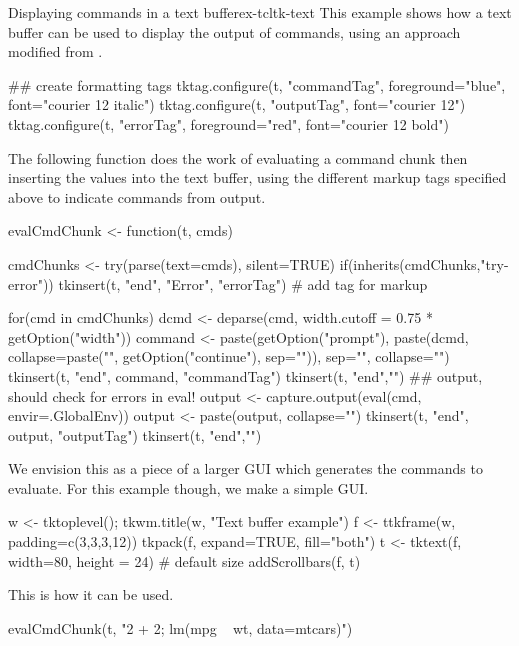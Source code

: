 \begin{example}{Displaying commands in a text buffer}{ex-tcltk-text}
This example shows how a text buffer can be used to display the output
of \R\/ commands, using an approach modified from .

\begin{Schunk}
\begin{Sinput}
 ## create formatting tags
 tktag.configure(t, "commandTag", foreground="blue", 
                 font="courier 12 italic")
 tktag.configure(t, "outputTag", font="courier 12")
 tktag.configure(t, "errorTag", foreground="red", 
                 font="courier 12 bold")
\end{Sinput}
\end{Schunk}

The following function does the work of evaluating a command chunk
then inserting the values into the text buffer, using the different
markup tags specified above to indicate commands from output.

\begin{Schunk}
\begin{Sinput}
 evalCmdChunk <- function(t, cmds) {
   
   cmdChunks <- try(parse(text=cmds), silent=TRUE)
   if(inherits(cmdChunks,"try-error")) {
     tkinsert(t, "end", "Error", "errorTag") # add tag for markup
   }
 
   for(cmd in cmdChunks) {
     dcmd <- deparse(cmd, width.cutoff = 0.75 * getOption("width"))
     command <- 
       paste(getOption("prompt"),
             paste(dcmd, collapse=paste("\n", getOption("continue"), 
                           sep="")),
             sep="", collapse="")
     tkinsert(t, "end", command, "commandTag")
     tkinsert(t, "end","\n")
     ## output, should check for errors in eval!
     output <- capture.output(eval(cmd, envir=.GlobalEnv))
     output <- paste(output, collapse="\n")
     tkinsert(t, "end", output, "outputTag")
     tkinsert(t, "end","\n")
   }
 }
\end{Sinput}
\end{Schunk}


We envision this as a piece of a larger GUI which generates the
commands to evaluate. For this example though, we make a simple GUI.

\begin{Schunk}
\begin{Sinput}
 w <- tktoplevel(); tkwm.title(w, "Text buffer example")
 f <- ttkframe(w, padding=c(3,3,3,12))
 tkpack(f, expand=TRUE, fill="both")
 t <- tktext(f, width=80, height = 24)   # default size
 addScrollbars(f, t)
\end{Sinput}
\end{Schunk}
 
This is how it can be used.
\begin{Schunk}
\begin{Sinput}
 evalCmdChunk(t, "2 + 2; lm(mpg ~ wt, data=mtcars)")
\end{Sinput}
\end{Schunk}
\end{example}


